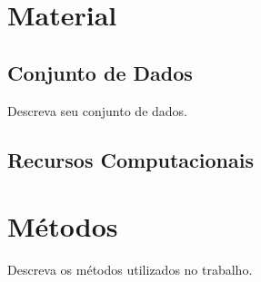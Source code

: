 \section{Material}

\subsection{Conjunto de Dados} \label{dados}

Descreva seu conjunto de dados.

\subsection{Recursos Computacionais}

\section{Métodos}

Descreva os métodos utilizados no trabalho. 